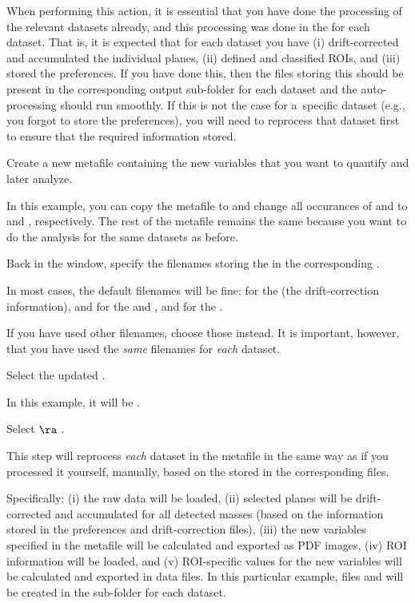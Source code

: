 \nb
When performing this action, it is essential that you have done the  processing of the relevant datasets already, and this processing was done in the  for each dataset. That is, it is expected that for each dataset you have (i) drift-corrected and accumulated the individual planes, (ii) defined and classified ROIs, and (iii) stored the preferences. If you have done this, then the files storing this  should be present in the corresponding output sub-folder for each dataset and the auto-processing should run smoothly. If this is not the case for a~specific dataset (e.g., you forgot to store the preferences), you will need to reprocess that dataset first to ensure that the required information  stored.

\s Create a new metafile containing the new variables that you want to quantify and later analyze. 

\nb
\bul In this example, you can copy the metafile  to  and change all occurances of  and  to 	and , respectively. The rest of the metafile remains the same because you want to do the analysis for the same datasets as before.

\s Back in the  window, specify the filenames storing the  in the corresponding .

\nb
\bul In most cases, the default filenames will be fine:  for the  (the drift-correction information),  and  for the  and , and  for the . 

\bul If you have used other filenames, choose those instead. It is important, however, that you have used the \emph{same} filenames for \emph{each} dataset.

\s Select the updated .

\nb
\bul In this example, it will be .

\s Select  $\ra$ .

\nb
\bul This step will reprocess \emph{each} dataset in the metafile in the same way as if you processed it yourself, manually, based on the  stored in the corresponding files. 

\bul Specifically: (i) the raw data will be loaded, (ii) selected planes will be drift-corrected and accumulated for all detected masses (based on the information stored in the preferences and drift-correction files), (iii) the new variables specified in the metafile will be calculated and exported as PDF images, (iv) ROI information will be loaded, and (v) ROI-specific values for the new variables will be calculated and exported in data files. In this particular example, files  and  will be created in the  sub-folder for each dataset.

